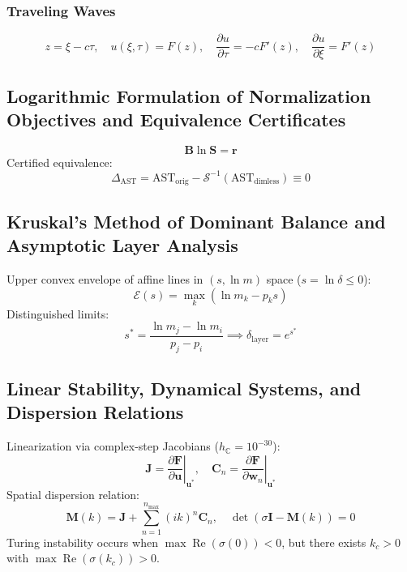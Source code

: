 \documentclass[11pt,a4paper]{article}
\begin{document}
\subsubsection{Traveling Waves}
\begin{equation}
z = \xi - c \tau, \quad u(\xi, \tau) = F(z), \quad \frac{\partial u}{\partial \tau} = -c F'(z), \quad \frac{\partial u}{\partial \xi} = F'(z)
\end{equation}

\subsection{Logarithmic Formulation of Normalization Objectives and Equivalence Certificates}

\begin{equation}
\mathbf{B} \ln \mathbf{S} = \mathbf{r}
\end{equation}
Certified equivalence:
\begin{equation}
\Delta_{\text{AST}} = \text{AST}_{\text{orig}} - \mathcal{S}^{-1}(\text{AST}_{\text{dimless}}) \equiv 0
\end{equation}

\subsection{Kruskal's Method of Dominant Balance and Asymptotic Layer Analysis}

Upper convex envelope of affine lines in $(s, \ln m)$ space ($s = \ln \delta \le 0$):
\begin{equation}
\mathcal{E}(s) = \max_k (\ln m_k - p_k s)
\end{equation}
Distinguished limits:
\begin{equation}
s^* = \frac{\ln m_j - \ln m_i}{p_j - p_i} \implies \delta_{\text{layer}} = e^{s^*}
\end{equation}

\subsection{Linear Stability, Dynamical Systems, and Dispersion Relations}

Linearization via complex-step Jacobians ($h_{\mathbb{C}} = 10^{-30}$):
\begin{equation}
\mathbf{J} = \left. \frac{\partial \mathbf{F}}{\partial \mathbf{u}} \right|_{\mathbf{u}^*}, \quad \mathbf{C}_n = \left. \frac{\partial \mathbf{F}}{\partial \mathbf{w}_n} \right|_{\mathbf{u}^*}
\end{equation}
Spatial dispersion relation:
\begin{equation}
\mathbf{M}(k) = \mathbf{J} + \sum_{n=1}^{n_{\max}} (i k)^n \mathbf{C}_n, \quad \det(\sigma \mathbf{I} - \mathbf{M}(k)) = 0
\end{equation}
Turing instability occurs when $\max \operatorname{Re}(\sigma(0)) < 0$, but there exists $k_c > 0$ with $\max \operatorname{Re}(\sigma(k_c)) > 0$.
\end{document}
